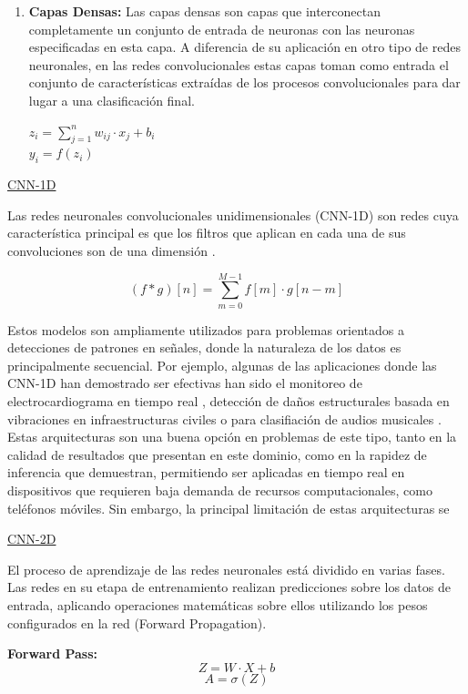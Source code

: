 \documentclass{uathesis-es}
\begin{document}
\begin{enumerate}
    \item \textbf{Capas Densas:} Las capas densas son capas que interconectan completamente un conjunto de entrada de neuronas con las neuronas especificadas en esta capa. A diferencia de su aplicación en otro tipo de redes neuronales, en las redes convolucionales estas capas toman como entrada el conjunto de características extraídas de los procesos convolucionales para dar lugar a una clasificación final.
    \begin{center}
        $z_i = \sum_{j=1}^{n} w_{ij} \cdot x_j + b_i$\\
        $y_i = f(z_i)$
    \end{center}
\end{enumerate}

\underline{CNN-1D}

Las redes neuronales convolucionales unidimensionales (CNN-1D) son redes cuya característica principal es que los filtros que aplican en cada una de sus convoluciones son de una dimensión \cite{CNN1D}.

$$(f * g)[n] = \sum_{m=0}^{M-1} f[m] \cdot g[n-m]$$

Estos modelos son ampliamente utilizados para problemas orientados a detecciones de patrones en señales, donde la naturaleza de los datos es principalmente secuencial. Por ejemplo, algunas de las aplicaciones donde las CNN-1D han demostrado ser efectivas han sido el monitoreo de electrocardiograma en tiempo real \cite{Kiranyaz2017tt}, detección de daños estructurales basada en vibraciones en infraestructuras civiles \cite{khodabandehlou2019vibration} o para clasifiación de audios musicales \cite{allamy20211d}. Estas arquitecturas son una buena opción en problemas de este tipo, tanto en la calidad de resultados que presentan en este dominio, como en la rapidez de inferencia que demuestran, permitiendo ser aplicadas en tiempo real en dispositivos que requieren baja demanda de recursos computacionales, como teléfonos móviles. Sin embargo, la principal limitación de estas arquitecturas se 

\underline{CNN-2D}


El proceso de aprendizaje de las redes neuronales está dividido en varias fases. Las redes en su etapa de entrenamiento realizan predicciones sobre los datos de entrada, aplicando operaciones matemáticas sobre ellos utilizando los pesos configurados en la red (Forward Propagation).

\textbf{Forward Pass:}
\[ Z = W \cdot X + b \]
\[ A = \sigma(Z) \]
\end{document}
